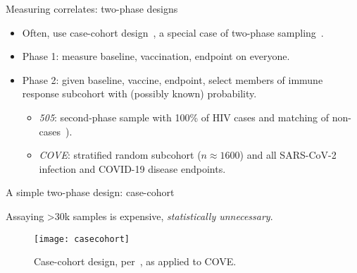 \documentclass{beamer}
\begin{document}
\begin{frame}[c]{Measuring correlates: two-phase designs}

\begin{center}
\begin{itemize}
  \itemsep8pt
    \item Often, use case-cohort design~\citep{prentice1986case}, a special
      case of two-phase sampling~\citep{breslow2003large}.
    \item Phase 1: measure baseline, vaccination, endpoint on everyone.
    \item Phase 2: given baseline, vaccine, endpoint, select members of
      immune response subcohort with (possibly known) probability.
      \vspace{-1em}
      \begin{itemize}
        \itemsep4pt
        \item \textit{505}: second-phase sample with 100\% of HIV cases and
          matching of non-cases~\citep[$n = 189$ per][]{janes2017higher}).
        \item \textit{COVE}: stratified random subcohort ($n \approx 1600$) and
          all SARS-CoV-2 infection and COVID-19 disease endpoints.
      \end{itemize}
\end{itemize}
\end{center}

\note{
}

\end{frame}


\begin{frame}[c]{A simple two-phase design: case-cohort}

Assaying >30k samples is expensive, \textit{statistically unnecessary}.
\vspace{-1em}
\begin{figure}[H]
  \centering
  \texttt{[image: casecohort]}
  \captionsetup{labelformat=empty}
  \vspace{-1.5em}
  \caption{
    Case-cohort design, per~\citet{prentice1986case}, as applied to COVE.
  }
\end{figure}

\note{
}

\end{frame}

\end{document}

